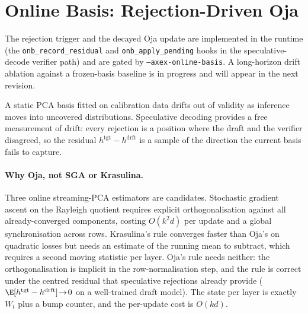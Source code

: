 \documentclass[11pt]{article}
\begin{document}
\section{Online Basis: Rejection-Driven Oja}
\label{sec:online}
The rejection trigger and the decayed Oja update are implemented in the
runtime (the \texttt{onb\_record\_residual} and
\texttt{onb\_apply\_pending} hooks in the speculative-decode verifier
path) and are gated by \texttt{--axex-online-basis}. A long-horizon
drift ablation against a frozen-basis baseline is in progress and will
appear in the next revision.

A static PCA basis fitted on calibration data drifts out of validity as
inference moves into uncovered distributions. Speculative decoding
\cite{leviathan2023speculative,chen2023speculative} provides a free
measurement of drift: every rejection is a position where the draft and
the verifier disagreed, so the residual $h^\text{tgt}-h^\text{drft}$ is
a sample of the direction the current basis fails to capture.

\paragraph{Why Oja, not SGA or Krasulina.}
Three online streaming-PCA estimators are candidates. Stochastic
gradient ascent on the Rayleigh quotient \cite{shamir2015fast} requires
explicit orthogonalisation against all already-converged components,
costing $O(k^2 d)$ per update and a global synchronisation across rows.
Krasulina's rule \cite{krasulina1969} converges faster than Oja's on
quadratic losses but needs an estimate of the running mean to subtract,
which requires a second moving statistic per layer. Oja's rule needs
neither: the orthogonalisation is implicit in the row-normalisation
step, and the rule is correct under the centred residual that
speculative rejections already provide
($\E[h^\text{tgt}-h^\text{drft}]\!\to\!0$ on a well-trained draft
model). The state per layer is exactly $W_t$ plus a bump counter, and
the per-update cost is $O(kd)$.
\end{document}
